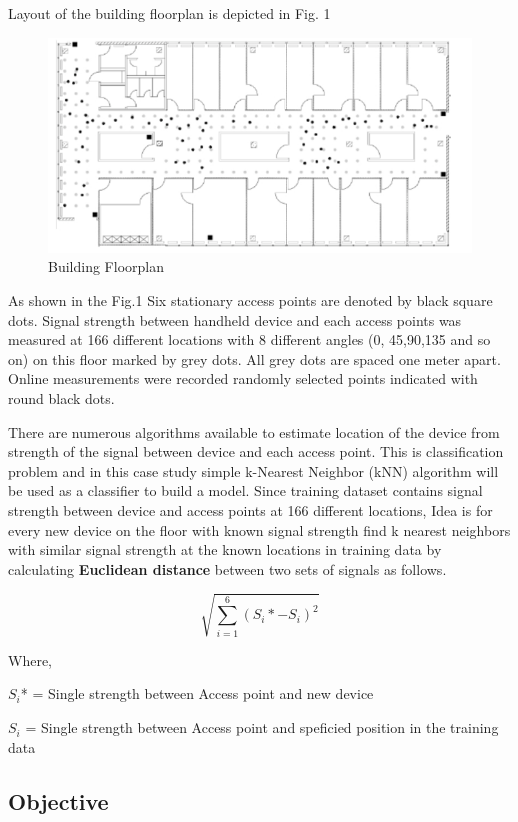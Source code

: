 \documentclass[
]{article}
\begin{document}
Layout of the building floorplan is depicted in Fig. 1

\begin{figure}[H]

{\centering \includegraphics[width=0.5\linewidth,height=0.5\textheight,]{images/Picture1} 

}

\caption{Building Floorplan}\label{fig:unnamed-chunk-2}
\end{figure}

As shown in the Fig.1 Six stationary access points are denoted by black
square dots. Signal strength between handheld device and each access
points was measured at 166 different locations with 8 different angles
(0, 45,90,135 and so on) on this floor marked by grey dots. All grey
dots are spaced one meter apart. Online measurements were recorded
randomly selected points indicated with round black dots.

There are numerous algorithms available to estimate location of the
device from strength of the signal between device and each access point.
This is classification problem and in this case study simple k-Nearest
Neighbor (kNN) algorithm will be used as a classifier to build a model.
Since training dataset contains signal strength between device and
access points at 166 different locations, Idea is for every new device
on the floor with known signal strength find k nearest neighbors with
similar signal strength at the known locations in training data by
calculating \textbf{Euclidean distance} between two sets of signals as
follows.

\[\sqrt{\sum_{i=1}^6(S_i* - S_i)^2}\]

Where,

\(S_i\)* = Single strength between Access point and new device

\(S_i\) = Single strength between Access point and speficied position in
the training data

\hypertarget{objective}{%
\subsection{Objective}\label{objective}}
\end{document}

